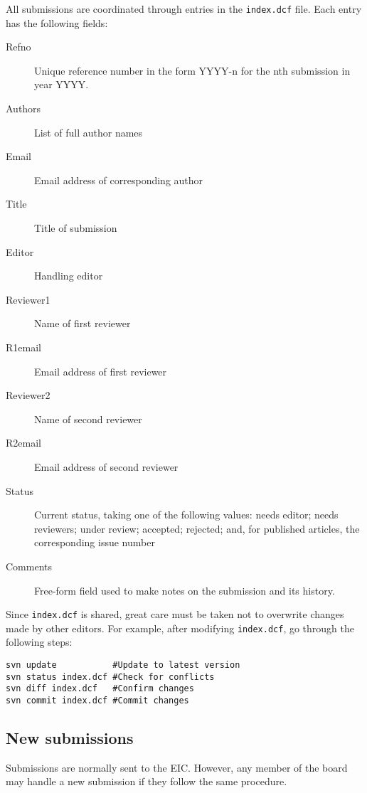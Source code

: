 \documentclass[11pt]{article}
\begin{document}
All submissions are coordinated through entries in the \texttt{index.dcf}
file. Each entry has the following fields:
\begin{description}
\item[Refno] Unique reference number in the form YYYY-n for the nth
  submission in year YYYY.
\item[Authors] List of full author names
\item[Email] Email address of corresponding author
\item[Title] Title of submission
\item[Editor] Handling editor
\item[Reviewer1] Name of first reviewer
\item[R1email] Email address of first reviewer
\item[Reviewer2] Name of second reviewer
\item[R2email] Email address of second reviewer
\item[Status] Current status, taking one of the following values:
  needs editor; needs reviewers; under review; accepted; rejected;
  and, for published articles, the corresponding issue number
\item[Comments] Free-form field used to make notes on the submission and
  its history.
\end{description}

Since \texttt{index.dcf} is shared, great care must be taken not to
overwrite changes made by other editors. For example, after modifying
\texttt{index.dcf}, go through the following steps:

\begin{verbatim}
svn update           #Update to latest version
svn status index.dcf #Check for conflicts
svn diff index.dcf   #Confirm changes
svn commit index.dcf #Commit changes
\end{verbatim}

\subsection{New submissions}

Submissions are normally sent to the EIC. However, any member of the
board may handle a new submission if they follow the same procedure.
\end{document}
